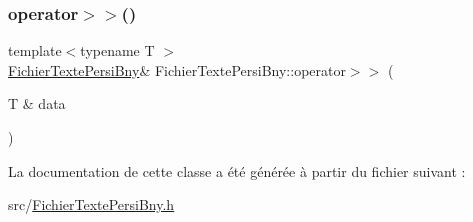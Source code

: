 \mbox{\label{classFichierTextePersiBny_a06cacad4ff051e5f4c0cec2590ea8132}} 
\subsubsection{\texorpdfstring{operator$>$$>$()}{operator>>()}}
{\footnotesize\ttfamily template$<$typename T $>$ \\
\hyperlink{classFichierTextePersiBny}{Fichier\+Texte\+Persi\+Bny}\& Fichier\+Texte\+Persi\+Bny\+::operator$>$$>$ (\begin{DoxyParamCaption}\item[{T \&}]{data }\end{DoxyParamCaption})\hspace{0.3cm}{\ttfamily [inline]}}



La documentation de cette classe a été générée à partir du fichier suivant \+:\begin{DoxyCompactItemize}
\item 
src/\hyperlink{FichierTextePersiBny_8h}{Fichier\+Texte\+Persi\+Bny.\+h}\end{DoxyCompactItemize}
